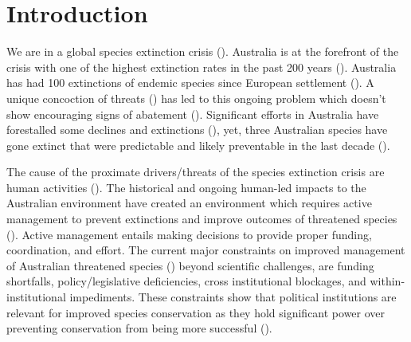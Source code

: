 \documentclass[a4paper,11pt]{article}
\begin{document}
\newpage
\section{Introduction}

We are in a global species extinction crisis (\cite{ceballosAcceleratedModernHuman2015,lewisDefiningAnthropocene2015,ipbesSummaryPolicymakersGlobal2019}). Australia is at the forefront of the crisis with one of the highest extinction rates in the past 200 years (\cite{woinarskiOngoingUnravelingContinental2015}). Australia has had 100 extinctions of endemic species since European settlement (\cite{rewoinarskiReadingBlackBook2019, commonwealthofaustraliaSpeciesProfileThreats2021}). A unique concoction of threats (\cite{kearneyThreatsAustraliaImperilled2019}) has led to this ongoing problem which doesn't show encouraging signs of abatement (\cite{simmondsVulnerableSpeciesEcosystems2020,wardLotsLossLittle2019,resideHowSendFinch2019}). Significant efforts in Australia have forestalled some declines and extinctions (\cite{kearneyThreatsAustraliaImperilled2019}), yet, three Australian species have gone extinct that were predictable and likely preventable in the last decade (\cite{woinarskiContributionPolicyLaw2017}).

The cause of the proximate drivers/threats of the species extinction crisis are human activities (\cite{sternerPolicyDesignAnthropocene2019, maxwellBiodiversityRavagesGuns2016,brookSynergiesExtinctionDrivers2008}). The historical and ongoing human-led impacts to the Australian environment have created an environment which requires active management to prevent extinctions and improve outcomes of threatened species (\cite{kearneyThreatsAustraliaImperilled2019, allekThreatsEndangeringAustralia2018}). Active management entails making decisions to provide proper funding, coordination, and effort. The current major constraints on improved management of Australian threatened species (\cite{leggeMonitoringThreatenedSpecies2018, wintleSpendingWhatWill2019, simmondsVulnerableSpeciesEcosystems2020,kearneyThreatsAustraliaImperilled2019,woinarskiReadingBlackBook2019,wardLotsLossLittle2019}) beyond scientific challenges, are funding shortfalls, policy/legislative deficiencies, cross institutional blockages, and within-institutional impediments. These constraints show that political institutions are relevant for improved species conservation as they hold significant power over preventing conservation from being more successful (\cite{rydenLinkingDemocracyBiodiversity2020}).
\end{document}
